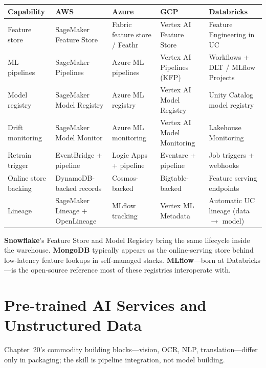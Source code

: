 \begin{center}
\footnotesize
\begin{tabular}{@{}p{2.4cm}p{2.9cm}p{2.9cm}p{2.9cm}p{2.9cm}@{}}
\toprule
\textbf{Capability} & \textbf{AWS} & \textbf{Azure} & \textbf{GCP} & \textbf{Databricks} \\
\midrule
Feature store & SageMaker Feature Store & Fabric feature store / Feathr & Vertex AI Feature Store & Feature Engineering in UC \\
ML pipelines & SageMaker Pipelines & Azure ML pipelines & Vertex AI Pipelines (KFP) & Workflows + DLT / MLflow Projects \\
Model registry & SageMaker Model Registry & Azure ML registry & Vertex AI Model Registry & Unity Catalog model registry \\
Drift monitoring & SageMaker Model Monitor & Azure ML monitoring & Vertex AI Model Monitoring & Lakehouse Monitoring \\
Retrain trigger & EventBridge + pipeline & Logic Apps + pipeline & Eventarc + pipeline & Job triggers + webhooks \\
\addlinespace
Online store backing & DynamoDB-backed records & Cosmos-backed & Bigtable-backed & Feature serving endpoints \\
Lineage & SageMaker Lineage + OpenLineage & MLflow tracking & Vertex ML Metadata & Automatic UC lineage (data $\rightarrow$ model) \\
\bottomrule
\end{tabular}
\end{center}

\noindent \textbf{Snowflake}'s Feature Store and Model Registry bring the same lifecycle inside
the warehouse. \textbf{MongoDB} typically appears as the online-serving store behind low-latency
feature lookups in self-managed stacks. \textbf{MLflow}---born at Databricks---is the open-source
reference most of these registries interoperate with.

\section{Pre-trained AI Services and Unstructured Data}
%
Chapter~20's commodity building blocks---vision, OCR, NLP, translation---differ only in packaging;
the skill is pipeline integration, not model building.

